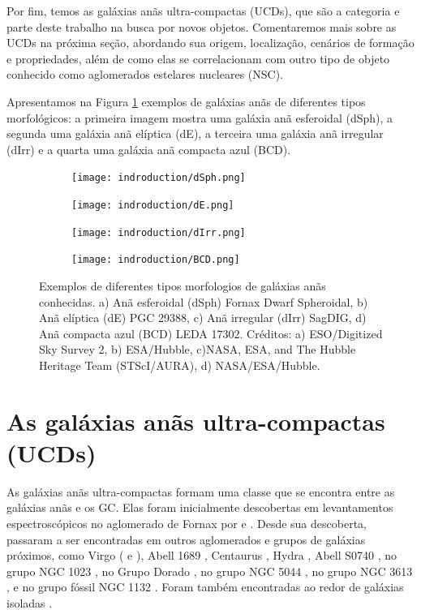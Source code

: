 Por fim, temos as galáxias anãs ultra-compactas (UCDs), que são a categoria e parte deste trabalho na busca por novos objetos. Comentaremos mais sobre as UCDs na próxima seção, abordando sua origem, localização, cenários de formação e propriedades, além de como elas se correlacionam com outro tipo de objeto conhecido como aglomerados estelares nucleares (\ac{NSC}).

Apresentamos na Figura \ref{dwarf_galaxies} exemplos de galáxias anãs de diferentes tipos morfológicos: a primeira imagem mostra uma galáxia anã esferoidal (dSph), a segunda uma galáxia anã elíptica (dE), a terceira uma galáxia anã irregular (dIrr) e a quarta uma galáxia anã compacta azul (BCD).


\begin{figure}[!ht]
    \centering
    \captionsetup{justification=centering}
    \begin{subfigure}[b]{0.33\textwidth}
        \texttt{[image: indroduction/dSph.png]}
        \caption{}
    \end{subfigure}
    \begin{subfigure}[b]{0.33\textwidth}
        \texttt{[image: indroduction/dE.png]}
        \caption{}
    \end{subfigure}
    \begin{subfigure}[b]{0.33\textwidth}
        \texttt{[image: indroduction/dIrr.png]}
        \caption{}
    \end{subfigure}
    \begin{subfigure}[b]{0.33\textwidth}
        \texttt{[image: indroduction/BCD.png]}
        \caption{}
    \end{subfigure}
    \caption{Exemplos de diferentes tipos morfologios de galáxias anãs conhecidas. a) Anã esferoidal (dSph) Fornax Dwarf Spheroidal, b) Anã elíptica (dE) PGC 29388, c) Anã irregular (dIrr) SagDIG, d) Anã compacta azul (BCD) LEDA 17302. Créditos: a) ESO/Digitized Sky Survey 2, b) ESA/Hubble, c)NASA, ESA, and The Hubble Heritage Team (STScI/AURA), d) NASA/ESA/Hubble.}
    \label{dwarf_galaxies}
\end{figure}


\section{As galáxias anãs ultra-compactas (UCDs)}\label{sec:UCDs}
As galáxias anãs ultra-compactas formam uma classe que se encontra entre as galáxias anãs e os \ac{GC}. Elas foram inicialmente descobertas em levantamentos espectroscópicos no aglomerado de Fornax por \cite{Drinkwater_2000} e \cite{Hilker_1999}. Desde sua descoberta, passaram a ser encontradas em outros aglomerados e grupos de galáxias próximos, como Virgo (\citealp{Hasegan_2005} e \citealp{Liu_2020}), Abell 1689 \citep{Mieske_2005}, Centaurus \citep{Mieske_2007}, Hydra \citep{Wehner_Harris_2007}, Abell S0740 \citep{Blakeslee_DeGraaff2008}, no grupo NGC 1023 \citep{Mieske_West_Oliveira_2007}, no Grupo Dorado \citep{Evstigneeva_2007}, no grupo NGC 5044 \citep{Faifer_2017}, no grupo NGC 3613 \citep{Bortoli_2020}, e no grupo fóssil NGC 1132 \citep{Madrid_2011}. Foram também encontradas ao redor de galáxias isoladas \citep{Hau_2009}.

